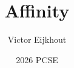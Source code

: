 \documentclass[10pt]{beamer}
\begin{document}
\author[Eijkhout]{Victor Eijkhout}
\date[2026]{2026 PCSE}
\title[affinity]{Affinity}
\maketitle


\end{document}
